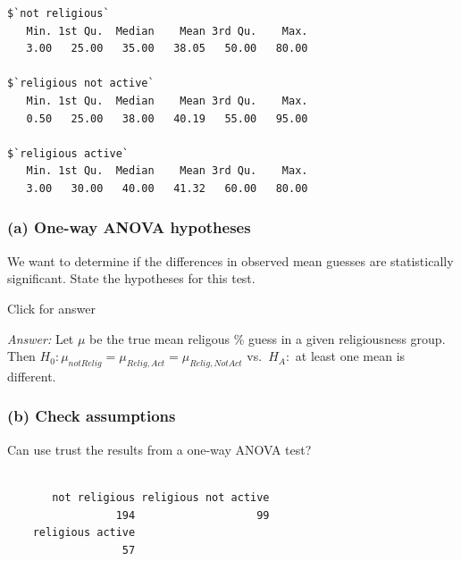 \documentclass[
]{book}
\newenvironment{Shaded}{\begin{snugshade}}{\end{snugshade}}
\newcommand{\FunctionTok}[1]{\textcolor[rgb]{0.00,0.00,0.00}{#1}}
\newcommand{\NormalTok}[1]{#1}
\newcommand{\SpecialCharTok}[1]{\textcolor[rgb]{0.00,0.00,0.00}{#1}}
\begin{document}
\begin{Shaded}
\end{Shaded}

\begin{verbatim}
$`not religious`
   Min. 1st Qu.  Median    Mean 3rd Qu.    Max. 
   3.00   25.00   35.00   38.05   50.00   80.00 

$`religious not active`
   Min. 1st Qu.  Median    Mean 3rd Qu.    Max. 
   0.50   25.00   38.00   40.19   55.00   95.00 

$`religious active`
   Min. 1st Qu.  Median    Mean 3rd Qu.    Max. 
   3.00   30.00   40.00   41.32   60.00   80.00 
\end{verbatim}

\hypertarget{a-one-way-anova-hypotheses-1}{%
\subsubsection{(a) One-way ANOVA hypotheses}\label{a-one-way-anova-hypotheses-1}}

We want to determine if the differences in observed mean guesses are statistically significant. State the hypotheses for this test.

Click for answer

\emph{Answer:} Let \(\mu\) be the true mean religous \% guess in a given religiousness group. Then \(H_0: \mu_{notRelig} = \mu_{Relig,Act} = \mu_{Relig,NotAct}\) vs.~\(H_A:\) at least one mean is different.

\hypertarget{b-check-assumptions}{%
\subsubsection{(b) Check assumptions}\label{b-check-assumptions}}

Can use trust the results from a one-way ANOVA test?

\begin{Shaded}
\end{Shaded}

\begin{verbatim}

       not religious religious not active 
                 194                   99 
    religious active 
                  57 
\end{verbatim}
\end{document}
